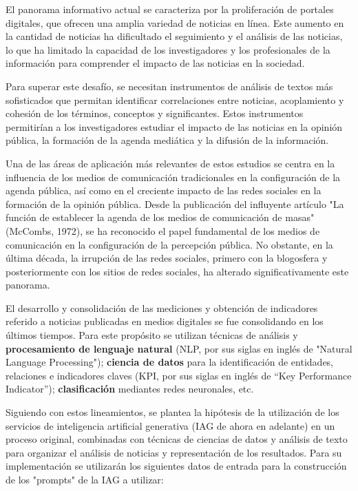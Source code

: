 \documentclass[12pt]{article}
\begin{document}
El panorama informativo actual se caracteriza por la proliferación de portales digitales, que ofrecen una amplia variedad de noticias en línea. Este aumento en la cantidad de noticias ha dificultado el seguimiento y el análisis de las noticias, lo que ha limitado la capacidad de los investigadores y los profesionales de la información para comprender el impacto de las noticias en la sociedad.

Para superar este desafío, se necesitan instrumentos de análisis de textos más sofisticados que permitan identificar correlaciones entre noticias, acoplamiento y cohesión de los términos, conceptos y significantes. Estos instrumentos permitirían a los investigadores estudiar el impacto de las noticias en la opinión pública, la formación de la agenda mediática y la difusión de la información.


Una de las áreas de aplicación más relevantes de estos estudios se centra en la influencia de los medios de comunicación tradicionales en la configuración de la agenda pública, así como en el creciente impacto de las redes sociales en la formación de la opinión pública. Desde la publicación del influyente artículo "La función de establecer la agenda de los medios de comunicación de masas" (McCombs, 1972)\cite{mccombs:1972}, se ha reconocido el papel fundamental de los medios de comunicación en la configuración de la percepción pública. No obstante, en la última década, la irrupción de las redes sociales, primero con la blogosfera y posteriormente con los sitios de redes sociales, ha alterado significativamente este panorama.


El desarrollo y consolidación de las mediciones y obtención de indicadores referido a noticias publicadas en medios digitales se fue consolidando en los últimos tiempos. Para este propósito se utilizan técnicas de análisis y \textbf{procesamiento de lenguaje natural} (NLP, por sus siglas en inglés de "Natural Language Processing"); \textbf{ciencia de datos} para la identificación de entidades, relaciones e indicadores claves (KPI, por sus siglas en inglés de ``Key Performance Indicator''); \textbf{clasificación} mediantes redes neuronales, etc. 

Siguiendo con estos lineamientos, se plantea la hipótesis de la utilización de los servicios de inteligencia artificial generativa (IAG de ahora en adelante) en un proceso original, combinadas con técnicas de ciencias de datos y análisis de texto para organizar el análisis de noticias y representación de los resultados.
Para su implementación se utilizarán los siguientes datos de entrada para la construcción de los "prompts" de la IAG a utilizar: 
\end{document}
